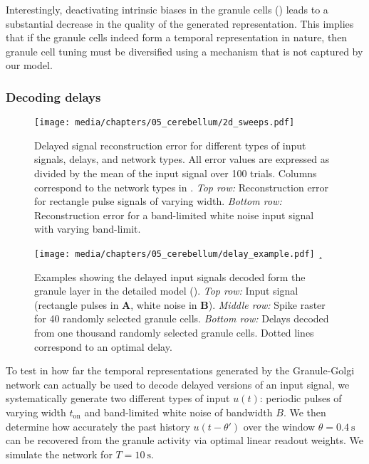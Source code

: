 Interestingly, deactivating intrinsic biases in the granule cells () leads to a substantial decrease in the quality of the generated representation.
This implies that if the granule cells indeed form a temporal representation in nature, then granule cell tuning must be diversified using a mechanism that is not captured by our model.

\subsubsection{Decoding delays}

\begin{figure}
	\centering
	\texttt{[image: media/chapters/05\_cerebellum/2d\_sweeps.pdf]}
	\caption[Delayed signal reconstruction errors in the Cerebellum model]{Delayed signal reconstruction error for different types of input signals, delays, and network types. All error values are expressed as \RMSE divided by the mean \RMS of the input signal over 100 trials. Columns correspond to the network types in . \emph{Top row:} Reconstruction error for rectangle pulse signals of varying width. \emph{Bottom row:} Reconstruction error for a band-limited white noise input signal with varying band-limit.}
	\label{fig:cerebellum_2d_sweeps}
\end{figure}

\begin{figure}
	\centering
    \texttt{[image: media/chapters/05\_cerebellum/delay\_example.pdf]}%
    {\label{fig:delay_example_a}}%
    {¸\label{fig:delay_example_b}}%
	\caption[Examples showing the delayed input signals decoded form the granule layer in the detailed model]{Examples showing the delayed input signals decoded form the granule layer in the detailed model (). \emph{Top row:} Input signal (rectangle pulses in \textbf{A}, white noise in \textbf{B}). \emph{Middle row:} Spike raster for 40 randomly selected granule cells. \emph{Bottom row:} Delays decoded from one thousand randomly selected granule cells. Dotted lines correspond to an optimal delay.}
	\label{fig:cerebellum_delay_example}
\end{figure}

To test in how far the temporal representations generated by the Granule-Golgi network can actually be used to decode delayed versions of an input signal, we systematically generate two different types of input $u(t)$: periodic pulses of varying width $t_\mathrm{on}$ and band-limited white noise of bandwidth $B$.
We then determine how accurately the past history $u(t - \theta')$ over the window $\theta = \SI{0.4}{\second}$ can be recovered from the granule activity via optimal linear readout weights.
We simulate the network for $T = \SI{10}{\second}$.

